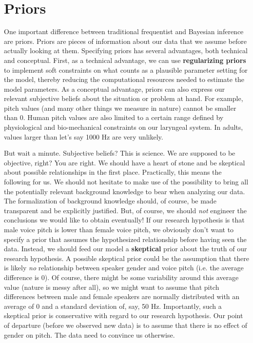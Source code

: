 \documentclass[nobib]{tufte-handout}
\begin{document}
%

\section{Priors}

One important difference between traditional frequentist and Bayesian inference are priors. Priors are pieces of information about our data that we assume before actually looking at them. Specifying priors has several advantages, both technical and conceptual. First, as a technical advantage, we can use \textbf{regularizing priors} to implement soft constraints on what counts as a plausible parameter setting for the model, thereby reducing the computational resources needed to estimate the model parameters.
%
%
As a conceptual advantage, priors can also express our relevant subjective beliefs about the situation or problem at hand. For example, pitch values (and many other things we measure in nature) cannot be smaller than 0. Human pitch values are also limited to a certain range defined by physiological and bio-mechanical constraints on our laryngeal system. In adults, values larger than let's say 1000 Hz are very unlikely. 
 
But wait a minute. Subjective beliefs? This is science. We are supposed to be objective, right? You are right. We should have a heart of stone and be skeptical about possible relationships in the first place.
Practically, this means the following for us. We should not hesitate to make use of the possibility to bring all the potentially relevant background knowledge to bear when analyzing our data. The formalization of background knowledge should, of course, be made transparent and be explicitly justified. But, of course, we should \emph{not} engineer the conclusions we would like to obtain eventually! If our research hypothesis is that male voice pitch is lower than female voice pitch, we obviously don't want to specify a prior that assumes the hypothesized relationship before having seen the data. Instead, we should feed our model a \textbf{skeptical} prior about the truth of our research hypothesis. A possible skeptical prior could be the assumption that there is likely \textit{no} relationship between speaker gender and voice pitch (i.e. the average difference is 0). Of course, there might be some variability around this average value (nature is messy after all), so we might want to assume that pitch differences between male and female speakers are normally distributed with an average of 0 and a standard deviation of, say, 50 Hz. Importantly, such a skeptical prior is conservative with regard to our research hypothesis. Our point of departure (before we observed new data) is to assume that there is no effect of gender on pitch. The data need to convince us otherwise.
\end{document}
